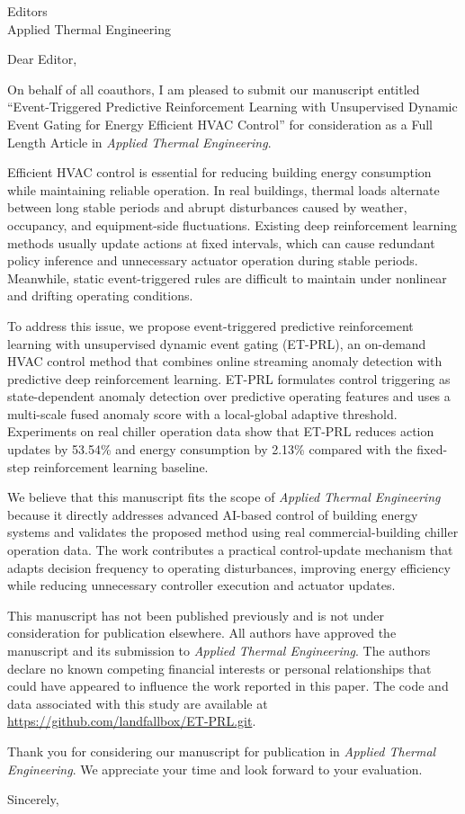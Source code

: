 \documentclass[11pt]{letter}
\begin{document}
\begin{letter}{Editors\\Applied Thermal Engineering}

\opening{Dear Editor,}

On behalf of all coauthors, I am pleased to submit our manuscript entitled ``Event-Triggered Predictive Reinforcement Learning with Unsupervised Dynamic Event Gating for Energy Efficient HVAC Control'' for consideration as a Full Length Article in \textit{Applied Thermal Engineering}.

Efficient HVAC control is essential for reducing building energy consumption while maintaining reliable operation. In real buildings, thermal loads alternate between long stable periods and abrupt disturbances caused by weather, occupancy, and equipment-side fluctuations. Existing deep reinforcement learning methods usually update actions at fixed intervals, which can cause redundant policy inference and unnecessary actuator operation during stable periods. Meanwhile, static event-triggered rules are difficult to maintain under nonlinear and drifting operating conditions.

To address this issue, we propose event-triggered predictive reinforcement learning with unsupervised dynamic event gating (ET-PRL), an on-demand HVAC control method that combines online streaming anomaly detection with predictive deep reinforcement learning. ET-PRL formulates control triggering as state-dependent anomaly detection over predictive operating features and uses a multi-scale fused anomaly score with a local-global adaptive threshold. Experiments on real chiller operation data show that ET-PRL reduces action updates by 53.54\% and energy consumption by 2.13\% compared with the fixed-step reinforcement learning baseline.

We believe that this manuscript fits the scope of \textit{Applied Thermal Engineering} because it directly addresses advanced AI-based control of building energy systems and validates the proposed method using real commercial-building chiller operation data. The work contributes a practical control-update mechanism that adapts decision frequency to operating disturbances, improving energy efficiency while reducing unnecessary controller execution and actuator updates.

This manuscript has not been published previously and is not under consideration for publication elsewhere. All authors have approved the manuscript and its submission to \textit{Applied Thermal Engineering}. The authors declare no known competing financial interests or personal relationships that could have appeared to influence the work reported in this paper. The code and data associated with this study are available at \url{https://github.com/landfallbox/ET-PRL.git}.

Thank you for considering our manuscript for publication in \textit{Applied Thermal Engineering}. We appreciate your time and look forward to your evaluation.

\closing{Sincerely,}

\end{letter}
\end{document}
